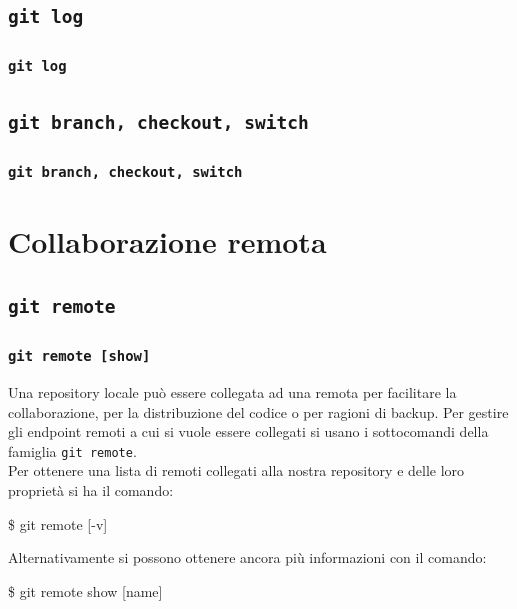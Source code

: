 \documentclass{beamer}
\begin{document}
\subsection{\texttt{git log}}
\begin{frame}
  \frametitle{\texttt{git log}}
\end{frame}

\subsection{\texttt{git branch, checkout, switch}}
\begin{frame}
  \frametitle{\texttt{git branch, checkout, switch}}
\end{frame}

\section{Collaborazione remota}

\subsection{\texttt{git remote}}
\begin{frame}
  \frametitle{\texttt{git remote [show]}}
  Una repository locale pu\`o essere collegata ad una remota per facilitare la
  collaborazione, per la distribuzione del codice o per ragioni di backup.
  Per gestire gli endpoint remoti a cui si vuole essere collegati si usano i
  sottocomandi della famiglia \texttt{git remote}. \\
  Per ottenere una lista di remoti collegati alla nostra repository e delle
  loro propriet\`a si ha il comando:
  \begin{semiverbatim}
  \$ git remote [-v]
  \end{semiverbatim}
  Alternativamente si possono ottenere ancora pi\`u informazioni con il comando:
  \begin{semiverbatim}
  \$ git remote show [name]
  \end{semiverbatim}
\end{frame}
\end{document}
